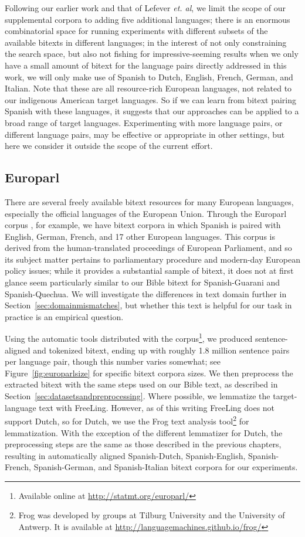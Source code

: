 Following our earlier work and that of Lefever \emph{et. al}, we limit the
scope of our supplemental corpora to adding five additional languages; there is
an enormous combinatorial space for running experiments with different subsets
of the available bitexts in different languages; in the interest of not only
constraining the search space, but also not fishing for impressive-seeming
results when we only have a small amount of bitext for the language pairs
directly addressed in this work, we will only make use of Spanish to Dutch,
English, French, German, and Italian. Note that these are all resource-rich
European languages, not related to our indigenous American target languages. So
if we can learn from bitext pairing Spanish with these languages, it suggests
that our approaches can be applied to a broad range of target languages.
Experimenting with more language pairs, or different language pairs, may be
effective or appropriate in other settings, but here we consider it outside the
scope of the current effort.

\subsection{Europarl}
There are several freely available bitext resources for many European
languages, especially the official languages of the European Union. Through the
Europarl corpus \cite{europarl}, for example, we have bitext corpora in which
Spanish is paired with English, German, French, and 17 other European
languages. This corpus is derived from the human-translated proceedings of
European Parliament, and so its subject matter pertains to parliamentary
procedure and modern-day European policy issues; while
it provides a substantial sample of bitext, it does not at first glance seem
particularly similar to our Bible bitext for Spanish-Guarani and
Spanish-Quechua. We will investigate the differences in text domain further in
Section~\ref{sec:domainmismatches}, but whether this text is helpful for our
task in practice is an empirical question.

Using the automatic tools distributed with the corpus\footnote{Available
online at \url{http://statmt.org/europarl/}}, we produced sentence-aligned
and tokenized bitext, ending up with roughly 1.8 million sentence pairs per
language pair, though this number varies somewhat; see
Figure~\ref{fig:europarlsize} for specific bitext corpora sizes.
We then preprocess the extracted bitext with the same steps used on our Bible
text, as described in Section~\ref{sec:datasetsandpreprocessing}. Where
possible, we lemmatize the target-language text with FreeLing. However, as of
this writing FreeLing does not support Dutch, so for Dutch, we use the Frog
text analysis tool\footnote{Frog was developed by groups at Tilburg University
and the University of Antwerp. It is available at
\url{http://languagemachines.github.io/frog/}} \cite{tadpole2007} for
lemmatization. With the exception of the different lemmatizer for Dutch, the
preprocessing steps are the same as those described in the previous chapters,
resulting in automatically aligned Spanish-Dutch, Spanish-English,
Spanish-French, Spanish-German, and Spanish-Italian bitext corpora for our
experiments.

